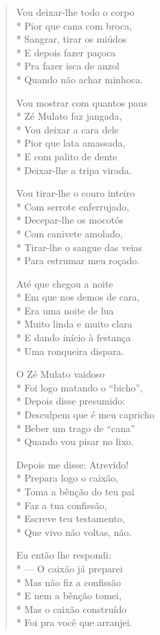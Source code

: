 \begin{verse}
Vou deixar-lhe todo o corpo\\*
Pior que cana com broca,\\*
Sangrar, tirar os miúdos\\*
E depois fazer paçoca\\*
Pra fazer isca de anzol\\*
Quando não achar minhoca.

Vou mostrar com quantos paus\\*
Zé Mulato faz jangada,\\*
Vou deixar a cara dele\\*
Pior que lata amassada,\\*
E com palito de dente\\*
Deixar-lhe a tripa virada.

Vou tirar-lhe o couro inteiro\\*
Com serrote enferrujado, \\*
Decepar-lhe os mocotós\\*
Com canivete amolado,\\*
Tirar-lhe o sangue das veias\\*
Para estrumar meu roçado.

Até que chegou a noite\\*
Em que nos demos de cara,\\*
Era uma noite de lua\\*
Muito linda e muito clara\\*
E dando início à festança\\*
Uma ronqueira dispara.

O Zé Mulato vaidoso\\*
Foi logo matando o “bicho”,\\*
Depois disse presumido:\\*
Desculpem que é meu capricho\\*
Beber um trago de “cana”\\*
Quando vou pisar no lixo.

Depois me disse: Atrevido!\\*
Prepara logo o caixão,\\*
Toma a bênção do teu pai\\*
Faz a tua confissão,\\*
Escreve teu testamento,\\*
Que vivo não voltas, não.

Eu então lhe respondi: \\*
— O caixão já preparei\\*
Mas não fiz a confissão\\*
E nem a bênção tomei,\\*
Mas o caixão construído\\*
Foi pra você que arranjei.


\end{verse}
